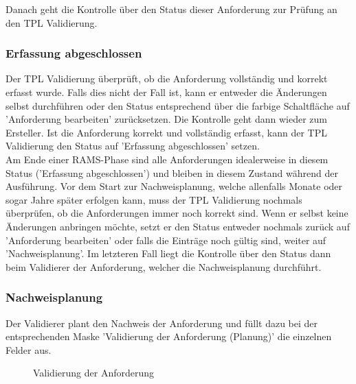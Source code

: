 Danach geht die Kontrolle über den Status dieser Anforderung zur Prüfung an den TPL Validierung. 

\subsubsection{Erfassung abgeschlossen}

Der TPL Validierung überprüft, ob die Anforderung vollständig und korrekt erfasst wurde. Falls dies nicht der Fall ist, kann er entweder die Änderungen selbst durchführen oder den Status entsprechend über die farbige Schaltfläche auf 'Anforderung bearbeiten' zurücksetzen. Die Kontrolle geht dann wieder zum Ersteller. Ist die Anforderung korrekt und vollständig erfasst, kann der TPL Validierung den Status auf 'Erfassung abgeschlossen' setzen. \\

Am Ende einer RAMS-Phase sind alle Anforderungen idealerweise in diesem Status ('Erfassung abgeschlossen') und bleiben in diesem Zustand während der Ausführung. Vor dem Start zur Nachweisplanung, welche allenfalls Monate oder sogar Jahre später erfolgen kann, muss der TPL Validierung nochmals überprüfen, ob die Anforderungen immer noch korrekt sind. Wenn er selbst keine Änderungen anbringen möchte, setzt er den Status entweder nochmals zurück auf 'Anforderung bearbeiten' oder falls die Einträge noch gültig sind, weiter auf 'Nachweisplanung'. Im letzteren Fall liegt die Kontrolle über den Status dann beim Validierer der Anforderung, welcher die Nachweisplanung durchführt. 

\subsubsection{Nachweisplanung}
\label{bkm:Ref2018071811}

Der Validierer plant den Nachweis der Anforderung und füllt dazu bei der entsprechenden Maske 'Validierung der Anforderung (Planung)'  die einzelnen Felder aus. 

\begin{figure}[H]
\caption{Validierung der Anforderung}
\end{figure}

